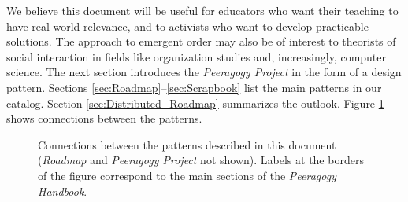 We believe this document will be useful for educators who want their teaching to have real-world relevance, and to activists who want to develop practicable solutions.   The approach to emergent order may also be of interest to theorists of social interaction in fields like organization studies and, increasingly, computer science.  The next section introduces the \emph{Peeragogy Project} in the form of a design pattern.  Sections \ref{sec:Roadmap}--\ref{sec:Scrapbook} list the main patterns in our catalog.  Section \ref{sec:Distributed_Roadmap} summarizes the outlook.  Figure \ref{fig:connections} shows connections between the patterns.

\begin{figure}
{\centering


\par
}
\vspace{-.9in}
\caption{Connections between the patterns described in this document (\emph{Roadmap} and \emph{Peeragogy Project} not shown).  Labels at the borders of the figure correspond to the main sections of the \emph{Peeragogy Handbook}.\label{fig:connections}}
\end{figure}
